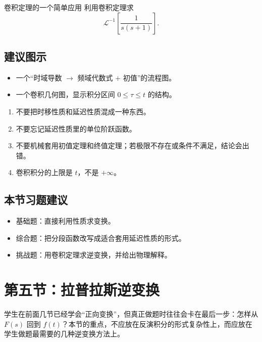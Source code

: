 \begin{lizi}{卷积定理的一个简单应用}{}
利用卷积定理求
\[
    \mathcal{L}^{-1}\left[\frac{1}{s(s+1)}\right].
\]
\end{lizi}

\subsection*{建议图示}
\begin{itemize}
    \item 一个``时域导数 $\to$ 频域代数式 $+$ 初值''的流程图。
    \item 一个卷积几何图，显示积分区间 $0\le \tau \le t$ 的结构。
\end{itemize}

\begin{jinshi}[本节易错点]
\begin{enumerate}
    \item 不要把时移性质和延迟性质混成一种东西。
    \item 不要忘记延迟性质里的单位阶跃函数。
    \item 不要机械套用初值定理和终值定理；若极限不存在或条件不满足，结论会出错。
    \item 卷积积分的上限是 $t$，不是 $+\infty$。
\end{enumerate}
\end{jinshi}

\subsection*{本节习题建议}
\begin{itemize}
    \item 基础题：直接利用性质求变换。
    \item 综合题：把分段函数改写成适合套用延迟性质的形式。
    \item 挑战题：用卷积定理求逆变换，并给出物理解释。
\end{itemize}

\section{第五节：拉普拉斯逆变换}

\begin{wulibj}[本节要解决的问题]
学生在前面几节已经学会``正向变换''，但真正做题时往往会卡在最后一步：怎样从 $F(s)$ 回到 $f(t)$？本节的重点，不应放在反演积分的形式复杂性上，而应放在学生做题最需要的几种逆变换方法上。
\end{wulibj}

